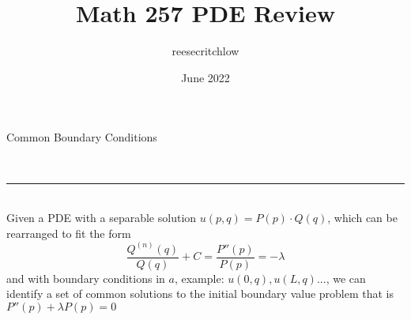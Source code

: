 \documentclass{article}
\title{Math 257 PDE Review}
\author{reesecritchlow }
\date{June 2022}
\begin{document}
\pagestyle{fancy}
\fancyhf{}

\renewcommand{\headrulewidth}{0pt}

\begin{large}
    \noindent Common Boundary Conditions
\end{large}\\
\rule{\textwidth}{0.5pt}\smallskip\\

\noindent Given a PDE with a separable solution $u(p, q) = P(p) \cdot Q(q)$, which can be rearranged to fit the form \[\frac{Q^{(n)}(q)}{Q(q)} + C = \frac{P''(p)}{P(p)} = -\lambda\]
and with boundary conditions in $a$, example: $u(0, q), u(L, q)...$, we can identify a set of common solutions to the initial boundary value problem that is $P''(p) + \lambda P(p) = 0$
\end{document}
